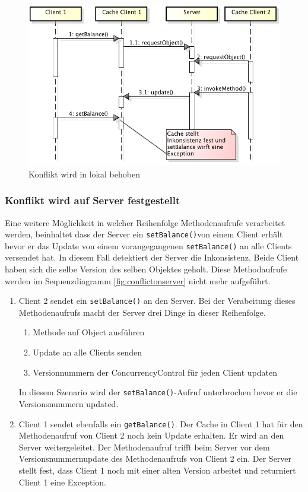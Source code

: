 \begin{figure}[h]
  \centering
\includegraphics[scale=0.6]{images_objectcaching/conflictInCache}  
  \caption{Konflikt wird in lokal behoben}
  \label{fig:localconflict}
\end{figure}

\subsubsection{Konflikt wird auf Server festgestellt}
\label{sec:konflikt-wird-auf-1}

Eine weitere Möglichkeit in welcher Reihenfolge Methodenaufrufe verarbeitet werden, beinhaltet dass der Server ein \verb|setBalance()|von einem Client erhält bevor er das Update von einem vorangegangenen \texttt{setBalance()} an alle Clients versendet hat. In diesem Fall detektiert der Server die Inkonsistenz. Beide Client haben sich die selbe Version des selben Objektes geholt. Diese Methodaufrufe werden im Sequenzdiagramm \ref{fig:conflictonserver} nicht mehr aufgeführt.

\begin{enumerate}
\item Client 2 sendet ein \verb|setBalance()| an den Server. Bei der Verabeitung dieses Methodenaufrufs macht der Server drei Dinge in dieser Reihenfolge.
  \begin{enumerate}
  \item Methode auf Object ausführen
  \item Update an alle Clients senden
  \item Versionnummern der ConcurrencyControl für jeden Client updat\-en
\end{enumerate}
In diesem Szenario wird der \texttt{setBalance()}-Aufruf unterbrochen bevor er die Versionsnummern updated.
\item Client 1 sendet ebenfalls ein \verb|getBalance()|. Der Cache in Client 1 hat für den Methodenaufruf von Client 2 noch kein Update erhalten. Er wird an den Server weitergeleitet. Der Methodenaufruf trifft beim Server vor dem Versionsnummernupdate des Methodenaufrufs von Client 2 ein. Der Server stellt fest, dass Client 1 noch mit einer alten Version arbeitet und returniert Client 1 eine Exception.
\end{enumerate}

